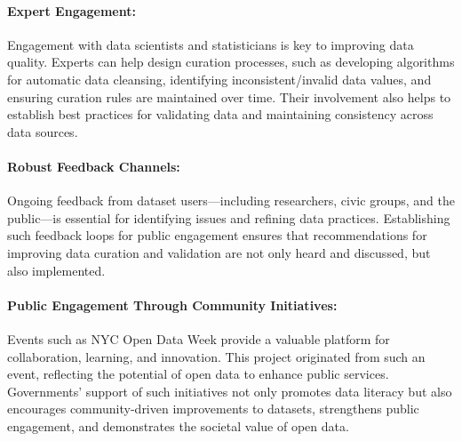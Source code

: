 \documentclass[linenumber]{jdsart}
\begin{document}
\paragraph{Expert Engagement:}
\label{par:experts}

Engagement with data scientists and statisticians is key to improving 
data quality. Experts can help design curation processes, 
such as developing algorithms for automatic data 
cleansing, identifying inconsistent/invalid data values, and ensuring curation
rules are maintained over time. Their involvement also
helps to establish best practices for validating data and
maintaining consistency across data sources. 


\paragraph{Robust Feedback Channels:}
\label{par:feedback}
Ongoing feedback from dataset users—including researchers, civic groups, 
and the public—is essential for identifying issues 
and refining data practices. Establishing such feedback loops 
for public engagement ensures that recommendations 
for improving data curation and validation 
are not only heard and discussed, but also implemented. 


\paragraph{Public Engagement Through Community Initiatives:}
\label{par:engagement}
Events such as NYC Open Data Week provide a valuable platform for 
collaboration, learning, and innovation. This project originated from 
such an event, reflecting the potential of open data to 
enhance public services. Governments’ support of such 
initiatives not only promotes data literacy but also 
encourages community-driven improvements to datasets, 
strengthens public engagement, and demonstrates the 
societal value of open data.


\end{document}
